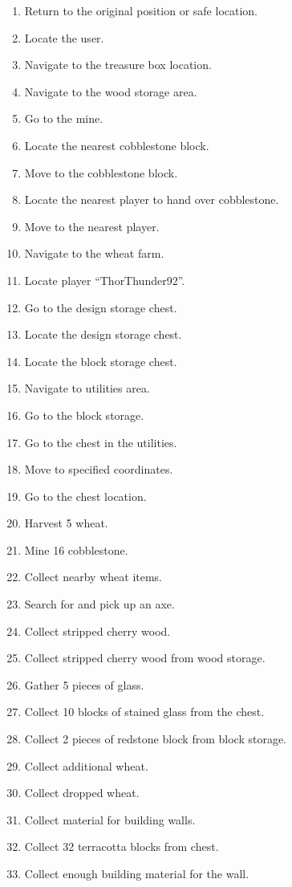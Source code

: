 \begin{small}
\begin{enumerate}
  \item Return to the original position or safe location.
  \item Locate the user.
  \item Navigate to the treasure box location.
  \item Navigate to the wood storage area.
  \item Go to the mine.
  \item Locate the nearest cobblestone block.
  \item Move to the cobblestone block.
  \item Locate the nearest player to hand over cobblestone.
  \item Move to the nearest player.
  \item Navigate to the wheat farm.
  \item Locate player ``ThorThunder92''.
  \item Go to the design storage chest.
  \item Locate the design storage chest.
  \item Locate the block storage chest.
  \item Navigate to utilities area.
  \item Go to the block storage.
  \item Go to the chest in the utilities.
  \item Move to specified coordinates.
  \item Go to the chest location.
  \item Harvest 5 wheat.
  \item Mine 16 cobblestone.
  \item Collect nearby wheat items.
  \item Search for and pick up an axe.
  \item Collect stripped cherry wood.
  \item Collect stripped cherry wood from wood storage.
  \item Gather 5 pieces of glass.
  \item Collect 10 blocks of stained glass from the chest.
  \item Collect 2 pieces of redstone block from block storage.
  \item Collect additional wheat.
  \item Collect dropped wheat.
  \item Collect material for building walls.
  \item Collect 32 terracotta blocks from chest.
  \item Collect enough building material for the wall.

\end{enumerate}
\end{small}
